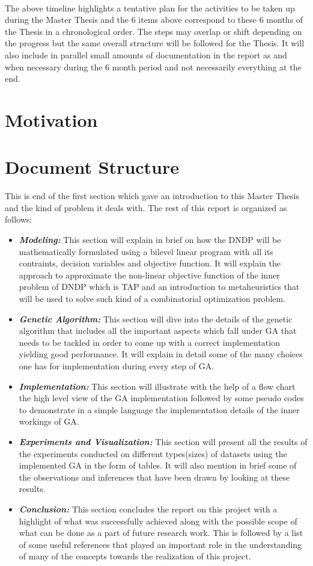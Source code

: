 \noindent
\\The above timeline highlights a tentative plan for the activities to be taken up during the Master Thesis and the $6$ items above correspond to these $6$ months of the Thesis in a chronological order. The steps may overlap or shift depending on the progress but the same overall structure will be followed for the Thesis. It will also include in parallel small amounts of documentation in the report as and when necessary during the $6$ month period and not necessarily everything at the end.\par

\section{Motivation}

\section{Document Structure}
This is end of the first section which gave an introduction to this Master Thesis and the kind of problem it deals with. The rest of this report is organized as follows:
\begin{itemize}
\item \textbf{\textit{Modeling:}} This section will explain in brief on how the DNDP will be mathematically formulated using a bilevel linear program with all its contraints, decision variables and objective function. It will explain the approach to approximate the non-linear objective function of the inner problem of DNDP which is TAP and an introduction to metaheuristics that will be used to solve such kind of a combinatorial optimization problem.
\item \textbf{\textit{Genetic Algorithm:}} This section will dive into the details of the genetic algorithm that includes all the important aspects which fall under GA that needs to be tackled in order to come up with a correct implementation yielding good performance. It will explain in detail some of the many choices one has for implementation during every step of GA.
\item \textbf{\textit{Implementation:}} This section will illustrate with the help of a flow chart the high level view of the GA implementation followed by some pseudo codes to demonstrate in a simple language the implementation details of the inner workings of GA.
\item \textbf{\textit{Experiments and Visualization:}} This section will present all the results of the experiments conducted on different types(sizes) of datasets using the implemented GA in the form of tables. It will also mention in brief some of the observations and inferences that have been drawn by looking at these results.
\item \textbf{\textit{Conclusion:}} This section concludes the report on this project with a highlight of what was successfully achieved along with the possible scope of what can be done as a part of future research work. This is followed by a list of some useful references that played an important role in the understanding of many of the concepts towards the realization of this project.
\end{itemize}
